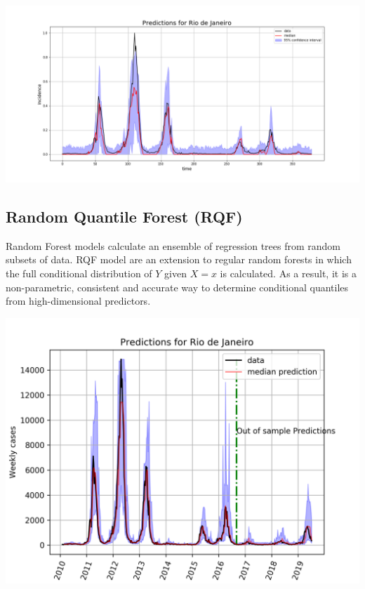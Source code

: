 \documentclass[a0,portrait]{a0poster}
\begin{document}
\begin{multicols}{3}
\begin{center}\vspace{1cm} 
    \includegraphics[width=\linewidth]{figures/LSTM_dropout.png}
\end{center}%

\subsection*{Random Quantile Forest (RQF)}
Random Forest models calculate an ensemble of regression trees from random 
subsets of data. RQF model are an extension to regular random forests in which 
the full conditional distribution of $Y$ given $X=x$ is calculated. As a 
result, it is a non-parametric, consistent and accurate way to determine 
conditional quantiles from high-dimensional 
predictors\cite{meinshausen2006quantile}.
\begin{center}\vspace{1cm}
\includegraphics[width=0.9\linewidth]{figures/qf_Rio_de_Janeiro_dengue.png}
\end{center}%


\end{multicols}
\end{document}
